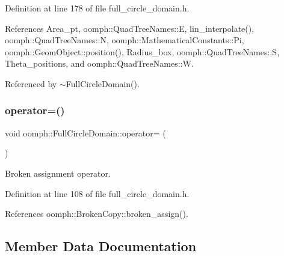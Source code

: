 Definition at line 178 of file full\+\_\+circle\+\_\+domain.\+h.



References Area\+\_\+pt, oomph\+::\+Quad\+Tree\+Names\+::E, lin\+\_\+interpolate(), oomph\+::\+Quad\+Tree\+Names\+::N, oomph\+::\+Mathematical\+Constants\+::\+Pi, oomph\+::\+Geom\+Object\+::position(), Radius\+\_\+box, oomph\+::\+Quad\+Tree\+Names\+::S, Theta\+\_\+positions, and oomph\+::\+Quad\+Tree\+Names\+::W.



Referenced by $\sim$\+Full\+Circle\+Domain().

\mbox{\label{classoomph_1_1FullCircleDomain_a9293b7e09e37a9bc3cc4e495e6a22587}} 
\subsubsection{\texorpdfstring{operator=()}{operator=()}}
{\footnotesize\ttfamily void oomph\+::\+Full\+Circle\+Domain\+::operator= (\begin{DoxyParamCaption}\item[{const \hyperlink{classoomph_1_1FullCircleDomain}{Full\+Circle\+Domain} \&}]{ }\end{DoxyParamCaption})\hspace{0.3cm}{\ttfamily [inline]}}



Broken assignment operator. 



Definition at line 108 of file full\+\_\+circle\+\_\+domain.\+h.



References oomph\+::\+Broken\+Copy\+::broken\+\_\+assign().



\subsection{Member Data Documentation}
\mbox{\label{classoomph_1_1FullCircleDomain_a49eca6b304caf0840bd99bd18a9a32cd}} 
